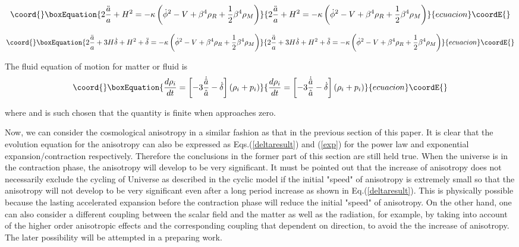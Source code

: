 \documentclass[a4paper,preprint]{revtex4}
\begin{document}
\begin{equation}\coord{}\boxEquation{\label{einstein22}
 2\frac{\ddot{a}}{a}+H^2=- \kappa \left(\dot{\phi}^2 -V +
\beta^4 \rho_R +{1\over 2} \beta^4 \rho_M \right)
}{2\frac{\ddot{a}}{a}+H^2=- \kappa \left(\dot{\phi}^2 -V +
\beta^4 \rho_R +{1\over 2} \beta^4 \rho_M \right)
}{ecuacion}\coordE{}\end{equation}

\begin{equation}\coord{}\boxEquation{\label{einstein33}
  2\frac{\ddot{a}}{a}+3H\dot{\delta}+H^2+\ddot{\delta}=- \kappa \left(\dot{\phi}^2 -V +
\beta^4 \rho_R +{1\over 2} \beta^4 \rho_M \right)
}{2\frac{\ddot{a}}{a}+3H\dot{\delta}+H^2+\ddot{\delta}=- \kappa \left(\dot{\phi}^2 -V +
\beta^4 \rho_R +{1\over 2} \beta^4 \rho_M \right)
}{ecuacion}\coordE{}\end{equation}

\noindent The fluid equation of motion for matter or fluid is
\begin{equation}\coord{}\boxEquation{\label{flueq}
\frac{d \rho_i}{d
t}=\left[-3\frac{\dot{\hat{a}}}{\hat{a}}-\dot{\delta}\right](\rho_i+p_i)
}{\frac{d \rho_i}{d
t}=\left[-3\frac{\dot{\hat{a}}}{\hat{a}}-\dot{\delta}\right](\rho_i+p_i)
}{ecuacion}\coordE{}\end{equation}

\noindent where \coordHE{} and \myHighlight{$\beta(\phi)$}\coordHE{} is such
chosen that the quantity \coordHE{} is finite when \coordHE{} approaches
zero.

Now, we can consider the cosmological anisotropy in a similar
fashion as that in the previous section of this paper. It is clear
that the evolution equation for the anisotropy can also be
expressed as Eqs.(\ref{deltaresult}) and (\ref{exp}) for the power
law and exponential expansion/contraction respectively. Therefore
the conclusions in the former part of this section are still held
true. When the universe is in the contraction phase, the
anisotropy will develop to be very significant. It must be pointed
out that the increase of anisotropy does not necessarily exclude
the cycling of Universe as described in the cyclic model if the
initial "speed" of anisotropy \coordHE{} is extremely
small so that the anisotropy will not develop to be very
significant even after a long period increase as shown in
Eq.(\ref{deltaresult}). This is physically possible because the
lasting accelerated expansion before the contraction phase will
reduce the initial "speed" of anisotropy. On the other hand, one
can also consider a different coupling between the scalar field
and the matter as well as the radiation, for example, by taking
into account of the higher order anisotropic effects and the
corresponding coupling that dependent on direction, to avoid the
the increase of anisotropy. The later possibility will be
attempted in a preparing work.
\end{document}
